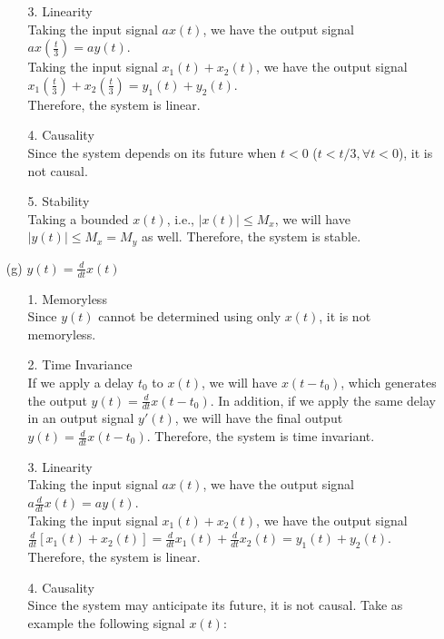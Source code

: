 \documentclass{article}
\begin{document}
\begin{enumerate}
\begin{enumerate}
            \item[3.] Linearity \\ 
                Taking the input signal $ax(t)$, we have the output signal $ax(\frac{t}{3}) = ay(t)$. \\
                Taking the input signal $x_{1}(t)+x_{2}(t)$, we have the output signal $x_{1}(\frac{t}{3})+x_{2}(\frac{t}{3}) = y_{1}(t)+y_{2}(t)$. \\
                Therefore, the system is linear.
            \item[4.] Causality \\
                Since the system depends on its future when $t < 0$ ($t < t/3, \forall t < 0$), it is not causal.
            \item[5.] Stability \\
                Taking a bounded $x(t)$, i.e., $|x(t)| \leq M_{x}$, we will have $|y(t)| \leq M_{x} = M_{y}$ as well. Therefore, the system is stable.
        \end{enumerate}
    \item[(g)] $y(t) = \frac{d}{dt}x(t)$
        \begin{enumerate}
            \item[1.] Memoryless \\
                Since $y(t)$ cannot be determined using only $x(t)$, it is not memoryless.
            \item[2.] Time Invariance \\
                If we apply a delay $t_{0}$ to $x(t)$, we will have $x(t-t_{0})$, which generates the output $y(t) = \frac{d}{dt}x(t-t_{0})$. In addition, if we apply the same delay in an output signal $y'(t)$, we will have the final output $y(t) = \frac{d}{dt}x(t-t_{0})$. Therefore, the system is time invariant.
            \item[3.] Linearity \\ 
                Taking the input signal $ax(t)$, we have the output signal $a\frac{d}{dt}x(t) = ay(t)$. \\
                Taking the input signal $x_{1}(t)+x_{2}(t)$, we have the output signal $\frac{d}{dt}[x_{1}(t)+x_{2}(t)] = \frac{d}{dt}x_{1}(t) + \frac{d}{dt}x_{2}(t) = y_{1}(t)+y_{2}(t)$. \\
                Therefore, the system is linear.
            \item[4.] Causality \\
                Since the system may anticipate its future, it is not causal. Take as example the following signal $x(t)$: 

\end{enumerate}
\end{enumerate}
\end{document}

